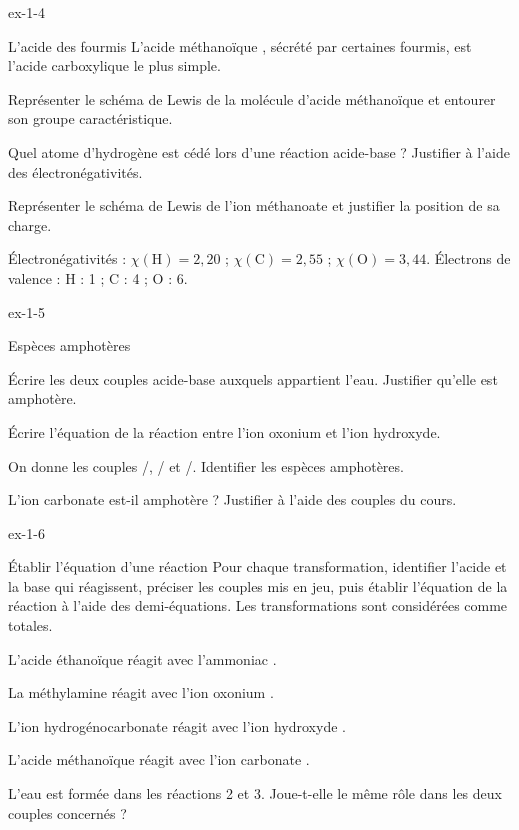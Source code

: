 \begin{blocLivre}{ex-1-4}
\begin{exercice}[1]{L'acide des fourmis}
L'acide méthanoïque , sécrété par certaines fourmis, est l'acide carboxylique le plus simple.
\begin{questions}
\item Représenter le schéma de Lewis de la molécule d'acide méthanoïque et entourer son groupe caractéristique.
\item Quel atome d'hydrogène est cédé lors d'une réaction acide-base ? Justifier à l'aide des électronégativités.
\item Représenter le schéma de Lewis de l'ion méthanoate  et justifier la position de sa charge.
\end{questions}
\begin{donnees}
Électronégativités : $\chi(\mathrm{H})=2{,}20$ ; $\chi(\mathrm{C})=2{,}55$ ; $\chi(\mathrm{O})=3{,}44$.
Électrons de valence : H : 1 ; C : 4 ; O : 6.
\end{donnees}
\end{exercice}
\end{blocLivre}
\begin{blocLivre}{ex-1-5}
\begin{exercice}[1]{Espèces amphotères}
\begin{questions}
\item Écrire les deux couples acide-base auxquels appartient l'eau. Justifier qu'elle est amphotère.
\item Écrire l'équation de la réaction entre l'ion oxonium et l'ion hydroxyde.
\item On donne les couples /, / et /.
Identifier les espèces amphotères.
\item L'ion carbonate  est-il amphotère ? Justifier à l'aide des couples du cours.
\end{questions}
\end{exercice}
\end{blocLivre}
\begin{blocLivre}{ex-1-6}
\begin{exercice}[2]{Établir l'équation d'une réaction}
Pour chaque transformation, identifier l'acide et la base qui réagissent, préciser les couples
mis en jeu, puis établir l'équation de la réaction à l'aide des demi-équations.
Les transformations sont considérées comme totales.
\begin{questions}
\item L'acide éthanoïque  réagit avec l'ammoniac .
\item La méthylamine  réagit avec l'ion oxonium .
\item L'ion hydrogénocarbonate  réagit avec l'ion hydroxyde .
\item L'acide méthanoïque  réagit avec l'ion carbonate .
\item L'eau est formée dans les réactions 2 et 3. Joue-t-elle le même rôle dans les deux couples concernés ?
\end{questions}
\end{exercice}
\end{blocLivre}
